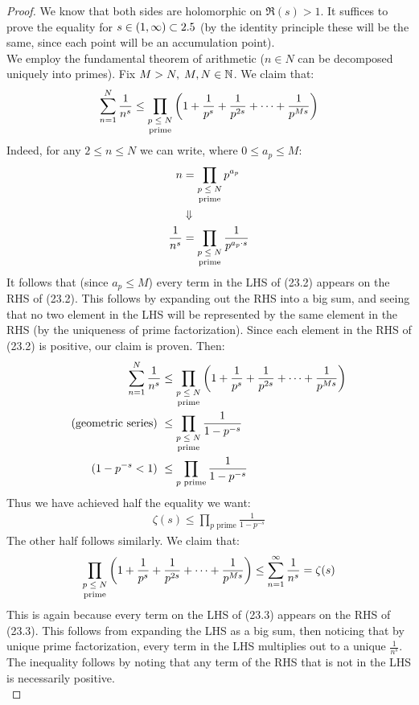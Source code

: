 \begin{proof}
We know that both sides are holomorphic on $\Re(s) >1$. It suffices to prove the equality for $s \in (1, \infty) \subset 2.5$ (by the identity principle these will be the same, since each point will be an accumulation point).\\

We employ the fundamental theorem of arithmetic ($ n \in N$ can be decomposed uniquely into primes). Fix $M> N, \; M,N \in \mathbb{N}$. We claim that:
\begin{align}
    \sum_{n=1}^N \frac{1}{n^s} \leq \prod_{\text{\stackanchor{$p \leq N$}{prime}}} \br{1 + \frac{1}{p^s} + \frac{1}{p^{2s} } + \cdots + \frac{1}{p^{Ms}}}
\end{align}
Indeed, for any $2 \leq n \leq N$ we can write, where $0 \leq a_p \leq M$:
\begin{align*}
n &= \prod_{\text{\stackanchor{$p \leq N$}{prime}}} p ^{a_p}\\
&\Downarrow\\
\frac{1}{n^s} &= \prod_{\text{\stackanchor{$p \leq N$}{prime}}} \frac{1}{p^{a_p  \cdot s}}
\end{align*}
It follows that (since $a_p \leq M$) every term in the LHS of (23.2) appears on the RHS of (23.2). This follows by expanding out the RHS into a big sum, and seeing that no two element in the LHS will be represented by the same element in the RHS (by the uniqueness of prime factorization). Since each element in the RHS of (23.2) is positive, our claim is proven. Then:
\begin{align*}
    \sum_{n=1}^N \frac{1}{n^s} &\leq \prod_{\text{\stackanchor{$p \leq N$}{prime}}} \br{1 + \frac{1}{p^s} + \frac{1}{p^{2s} } + \cdots + \frac{1}{p^{Ms}}}\\
    \text{(geometric series) }&\leq \prod_{\text{\stackanchor{$p \leq N$}{prime}}} \frac{1}{1-p^{-s}}\\
    \text{($1-p^{-s} < 1$) }&\leq \prod_{p  \text{ prime}} \frac{1}{1-p^{-s}}\\
\end{align*}
Thus we have achieved half the equality we want:
\begin{align*}
    \zeta(s) \leq \prod_{p  \text{ prime}} \frac{1}{1-p^{-s}}
\end{align*}
The other half follows similarly. We claim that:
\begin{align}
    \prod_{\text{\stackanchor{$p \leq N$}{prime}}} \br{1 + \frac{1}{p^s} + \frac{1}{p^{2s} } + \cdots + \frac{1}{p^{Ms}}} \leq \sum_{n=1}^\infty \frac{1}{n^s} = \zeta(s)
\end{align}
This is again because every term on the LHS of (23.3) appears on the RHS of (23.3). This follows from expanding the LHS as a big sum, then noticing that by unique prime factorization, every term in the LHS multiplies out to a unique $\frac{1}{n^s}$. The inequality follows by noting that any term of the RHS that is not in the LHS is necessarily positive.\\


\end{proof}
